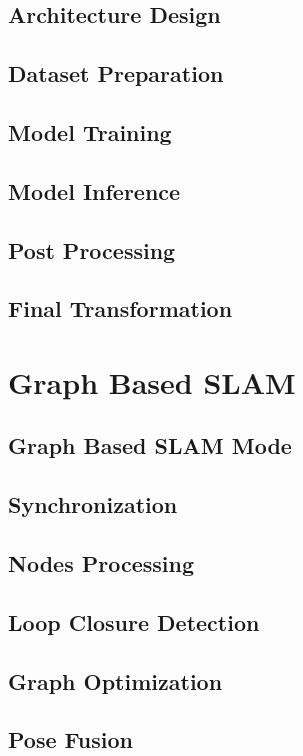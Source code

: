 \subsection{Architecture Design}
\ArchitectureDesign
\subsection{Dataset Preparation}
\DatasetPreparation
\subsection{Model Training}
\ModelTraining
\subsection{Model Inference}
\ModelInference
\subsection{Post Processing}
\PostProcessing
\subsection{Final Transformation}
\FinalTransformation

\section{Graph Based SLAM}
\GraphBasedSLAM
\subsection{Graph Based SLAM Mode}
\GraphBasedSLAMMode
\subsection{Synchronization}
\SensorFusion
\subsection{Nodes Processing}
\NodesProcessing
\subsection{Loop Closure Detection}
\LoopClosureDetection
\subsection{Graph Optimization}
\GraphOptimization
\subsection{Pose Fusion}
\PoseFusion

